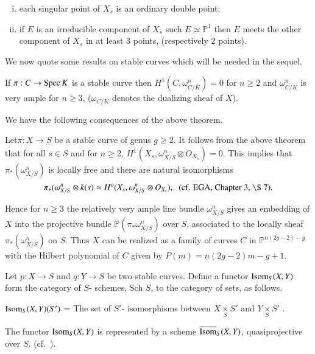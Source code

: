 {\begin{subdefin}
\begin{enumerate}[i)]
\item each singular point of $X_s$ is an ordinary double point; 

\item if $E$ is an irreducible component of $X_s$ such $E \simeq
  \mathbb{P}^1$ then $E$ meets the other component of $X_s$ in at
  least 3 points, (respectively 2 points). 
\end{enumerate}
\end{subdefin}

We now quote some results on stable curves which will be needed in the
sequel. 

\setcounter{subtheorem}{4}
\begin{subtheorem}\label{chap0:subthm0.1.5} %
If $\pi: C \rightarrow \operatorname{Spec} K $ is a stable curve then  $H^1 (C,
\omega^n_{C/K}) = 0 $ for  $n \ge 2$ and $\omega^n_{C/K}$ is very
ample for  $n \ge 3$,  ($\omega_{C/K}$ denotes the dualizing sheaf of
$X$). 
\end{subtheorem}

\noindent
We have the following consequences of the above theorem. 

Let\pageoriginale $\pi : X \rightarrow  S $ be a stable curve of genus
$g \ge 2$. It follows from the above theorem that  for all  $s \in S
$ and for  $ n \ge 2$, $H^1 (X_s, \omega^n_{X/S} \otimes O_{X_{s}}) =
0 $. This implies that  $\pi_* (\omega^n_{X/S})$  is locally free and
there are  natural isomorphisms 
$$
\pi_*(\omega^n_{X/S} \otimes k (s) \simeq  H^o (X_s, \omega^n_{X/S}
\otimes O_{X_{s}}), \;\; (\text{cf. EGA, Chapter 3, \S 7}). 
$$

\noindent
Hence for $n \ge 3$ the relatively very ample line bundle  $
\omega^n_{X/S} $ gives an embedding of $X$ into  the projective bundle
$ \mathbb{P} (\pi_* \omega^n_{X/S}) $ over $S$, associated to the
locally sheaf   $\pi_*( \omega^n_{X/S})$ on $S$. Thus $X$ can be
realized as a family of curves $C$ in $\mathbb{P}^{n (2g-2) -g}$
with the Hilbert polynomial of $C$ given by $P (m) = n (2g-2) m-g+1$.  

Let $ p : X \rightarrow S$ and  $q : Y \rightarrow S $ be two stable
curves. Define a functor  $\operatorname{Isom}_S (X,Y)$ form the category of  $S$-
schemes, Sch $S$, to the category of sets, as follows. 

\noindent
$\operatorname{Isom}_S (X,Y) (S') $ = The set of  $S'$- isomorphisms between $ X
\underset{S}{\times} S'$ and  $ Y \underset{S}{\times} S'$ .

\begin{subtheorem}\label{chap0:subthm0.1.6}%
The functor $\operatorname{Isom}_S (X, Y)$  is  represented by a scheme
$\overline{\operatorname{Isom}}_S (X, Y)$, quasiprojective over $S$. (cf.~\cite{key3}).  
\end{subtheorem}

}
